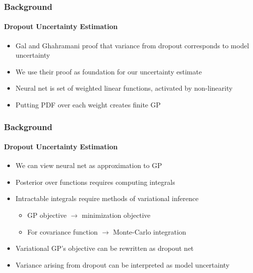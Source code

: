 \documentclass[9pt]{beamer}
\begin{document}
\begin{frame}
\frametitle{Background}
\framesubtitle{Dropout Uncertainty Estimation}
	\begin{itemize}
	\item Gal and Ghahramani \cite{gal2016dropout} proof that variance from dropout corresponds to model uncertainty
	\item We use their proof as foundation for our uncertainty estimate
	\item Neural net is set of weighted linear functions, activated by non-linearity
	\item Putting PDF over each weight creates finite GP
\end{itemize}
\end{frame}

\begin{frame}
\frametitle{Background}
\framesubtitle{Dropout Uncertainty Estimation}
\begin{itemize}
	\item We can view neural net as approximation to GP
	\item Posterior over functions requires computing integrals
	\item Intractable integrals require methods of variational inference
	\begin{itemize}
		\item GP objective $\rightarrow$ minimization objective
		\item For covariance function $\rightarrow$ Monte-Carlo integration
	\end{itemize}
	\item Variational GP's objective can be rewritten as dropout net
	\item Variance arising from dropout can be interpreted as model uncertainty
\end{itemize}
\end{frame}
\end{document}
